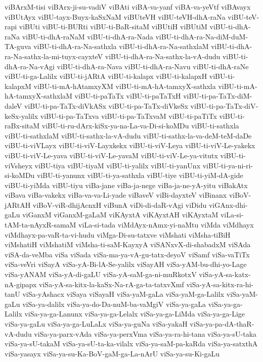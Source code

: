 {viBArxM-tisi
viBArx-ji-su-vadiV
viBAti
viBA-va-yanf
viBA-va-yeVtf
viBAvayx
viBUtAyx
viBU-tayx-Buyx-kaSxNaM
viBUteVH
viBU-teVH-dhA-raNa
viBU-teV-rapi
viBUti
viBU-ti-BURti
viBU-ti-BaR-sitaM
viBUtiH
viBUtiM
viBU-ti-dhA-raNa
viBU-ti-dhA-raNaM
viBU-ti-dhA-ra-Nada
viBU-ti-dhA-ra-Na-diM-duM-TA-guva
viBU-ti-dhA-ra-Na-sathxla
viBU-ti-dhA-ra-Na-sathxlaM
viBU-ti-dhA-ra-Na-sathx-la-mi-tuyx-cayxteV
viBU-ti-dhA-ra-Na-sathx-la-vA-dudu
viBU-ti-dhA-ra-Na-vAgi
viBU-ti-dhA-ra-Nava
viBU-ti-dhA-ra-Navu
viBU-ti-dhA-raNe
viBU-ti-ga-Lalilx
viBU-ti-jARtA
viBU-ti-kalapx
viBU-ti-kalapxH
viBU-ti-kalapxM
viBU-ti-mA-hAtamxyXM
viBU-ti-mA-hA-tamxyX-sathxla
viBU-ti-mA-hA-tamxyX-sathxlaM
viBU-ti-paTaTx
viBU-ti-paTaTxH
viBU-ti-pa-TaTx-diM-daleV
viBU-ti-pa-TaTx-diVkASx
viBU-ti-pa-TaTx-diVkeSx
viBU-ti-pa-TaTx-diV-keSx-yalilx
viBU-ti-pa-TaTxva
viBU-ti-pa-TaTxvaM
viBU-ti-paTiTx
viBU-ti-raBx-sitaM
viBU-ti-ru-dArx-kiSx-ya-na-La-va-Di-si-koMDu
viBU-ti-sathxla
viBU-ti-sathxlaM
viBU-ti-sathx-la-vA-dudu
viBU-ti-sathx-la-va-deM-teM-daDe
viBU-ti-viVLayx
viBU-ti-viV-Layxkekx
viBU-ti-viV-Leya
viBU-ti-viV-Le-yakekx
viBU-ti-viV-Le-yava
viBU-ti-viV-Le-yavaM
viBU-ti-viV-Le-ya-vitutx
viBU-ti-viVsheyx
viBU-tiya
viBU-tiyaM
viBU-ti-yalilx
viBU-ti-yanUnx
viBU-ti-ya-ni-ri-si-koMDu
viBU-ti-yanunx
viBU-ti-ya-sathxla
viBU-tiye
viBU-ti-yiM-dA-gide
viBU-ti-yiMda
viBU-tiyu
viBa-jane
viBa-ja-nege
viBa-ja-ne-yA-yitu
viBakAtx
viBava
viBa-vakekx
viBa-va-va-Li-yade
viBaveV
viBi-dayxteV
viBinanx
viBoV-jARtAH
viBoV-viR-dhijAcnxH
viBunA
viDi-di-daR-vAgi
viDidu
viGAnx-dhi-gaLu
viGanxM
viGanxM-gaLaM
viKAyxtA
viKAyxtAH
viKAyxtaM
viLa-si-tAM-ta-nAyxR-samaM
viLa-si-tada
viMdAyx-nAmx-yi-naMtu
viMda
viMdhayx
viMdhayx-pa-vaR-ta-vi-hudu
viMga-Di-su-tatxve
viMshati
viMsha-tiBiH
viMshatiH
viMshatiM
viMsha-ti-saM-KayxyA
viSANxvX-di-shabadxM
viSAda
viSA-da-veMba
viSa
viSada
viSa-ma-ya-vA-gu-tatx-deyoV
viSamf
viSa-vaTiTx
viSa-veVri
viSayA
viSa-yA-Bi-lA-Se-yalilx
viSayAH
viSa-yAM-bu-dhi-yo-Lage
viSa-yANAM
viSa-yA-di-gaLU
viSa-yA-saM-ga-ni-muRkotxV
viSa-yA-sa-katx-nA-gipapx
viSa-yA-sa-kitx-la-kaSx-Na-rA-ga-ta-tatxvXmf
viSa-yA-sa-kitx-ra-hi-tanU
viSa-yAshacx
viSaya
viSayaH
viSa-yaM-gaLa
viSa-yaM-ga-Lalilx
viSa-yaM-gaLu
viSa-ya-dalilx
viSa-ya-do-Da-nuM-ba-vaMgiV
viSa-ya-gaLa
viSa-ya-ga-Lalilx
viSa-ya-ga-Lanunx
viSa-ya-ga-Lelalx
viSa-ya-ga-LiMda
viSa-ya-ga-Lige
viSa-ya-gaLu
viSa-ya-ga-LuLaLx
viSa-ya-guNa
viSa-yakaH
viSa-ya-pa-dA-thaR-vA-dudu
viSa-ya-parx-vAda
viSa-ya-perxVma
viSa-ya-ra-hi-tana
viSa-ya-sU-taka
viSa-ya-sU-takaM
viSa-ya-sU-ta-ka-vilalx
viSa-ya-saM-pa-kaRda
viSa-ya-satxthA
viSa-yasayx
viSa-ya-su-Ka-BoV-gaM-ga-La-nArU
viSa-ya-su-Ki-gaLu
}
